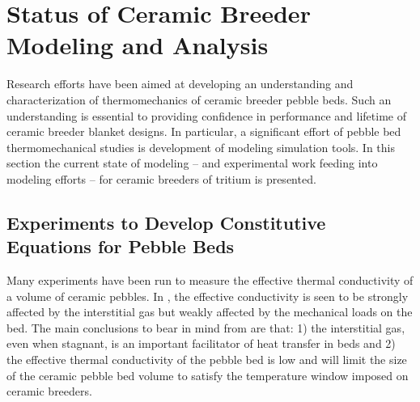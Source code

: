 \FloatBarrier


















\FloatBarrier

%
%
\section{Status of Ceramic Breeder Modeling and Analysis}\label{sec:modeling-state}

Research efforts have been aimed at developing an understanding and characterization of thermomechanics of ceramic breeder pebble beds. Such an understanding is essential to providing confidence in performance and lifetime of ceramic breeder blanket designs. In particular, a significant effort of pebble bed thermomechanical studies is development of modeling simulation tools. In this section the current state of modeling -- and experimental work feeding into modeling efforts -- for ceramic breeders of tritium is presented.


\subsection{Experiments to Develop Constitutive Equations for Pebble Beds}




Many experiments have been run to measure the effective thermal conductivity of a volume of ceramic pebbles. In , the effective conductivity is seen to be strongly affected by the interstitial gas but weakly affected by the mechanical loads on the bed. The main conclusions to bear in mind from  are that: 1) the interstitial gas, even when stagnant, is an important facilitator of heat transfer in beds and 2) the effective thermal conductivity of the pebble bed is low and will limit the size of the ceramic pebble bed volume to satisfy the temperature window imposed on ceramic breeders.

